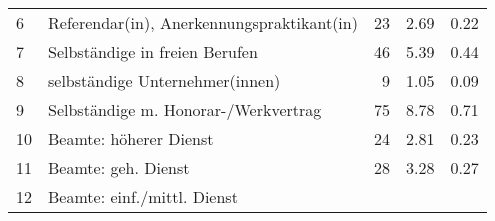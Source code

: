 \begin{longtable}{lXrrr}
     6 &
     \multicolumn{1}{X}{ Referendar(in), Anerkennungspraktikant(in)   } &


       \num{23} &
       \num[round-mode=places,round-precision=2]{2,69} &
         \num[round-mode=places,round-precision=2]{0,22} \\

     7 &
     \multicolumn{1}{X}{ Selbständige in freien Berufen   } &


       \num{46} &
       \num[round-mode=places,round-precision=2]{5,39} &
         \num[round-mode=places,round-precision=2]{0,44} \\

     8 &
     \multicolumn{1}{X}{ selbständige Unternehmer(innen)   } &


       \num{9} &
       \num[round-mode=places,round-precision=2]{1,05} &
         \num[round-mode=places,round-precision=2]{0,09} \\

     9 &
     \multicolumn{1}{X}{ Selbständige m. Honorar-/Werkvertrag   } &


       \num{75} &
       \num[round-mode=places,round-precision=2]{8,78} &
         \num[round-mode=places,round-precision=2]{0,71} \\

     10 &
     \multicolumn{1}{X}{ Beamte: höherer Dienst   } &


       \num{24} &
       \num[round-mode=places,round-precision=2]{2,81} &
         \num[round-mode=places,round-precision=2]{0,23} \\

     11 &
     \multicolumn{1}{X}{ Beamte: geh. Dienst   } &


       \num{28} &
       \num[round-mode=places,round-precision=2]{3,28} &
         \num[round-mode=places,round-precision=2]{0,27} \\

     12 &
     \multicolumn{1}{X}{ Beamte: einf./mittl. Dienst   } &



\end{longtable}
